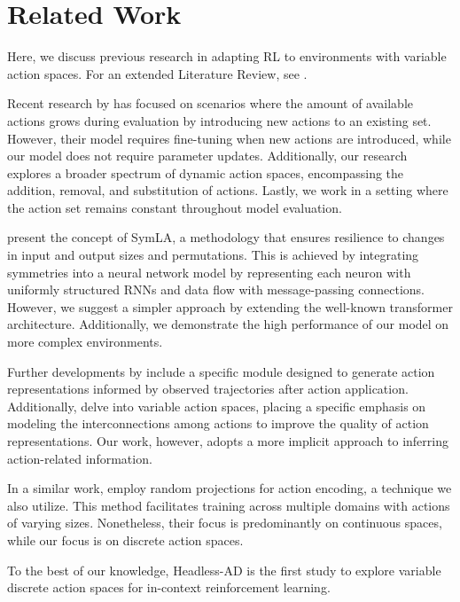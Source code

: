 \section{Related Work}

Here, we discuss previous research in adapting RL to environments with variable action spaces. For an extended Literature Review, see .

Recent research by \citet{chandak2020lifelong, ye2023action} has focused on scenarios where the amount of available actions grows during evaluation by introducing new actions to an existing set. However, their model requires fine-tuning when new actions are introduced, while our model does not require parameter updates. Additionally, our research explores a broader spectrum of dynamic action spaces, encompassing the addition, removal, and substitution of actions. Lastly, we work in a setting where the action set remains constant throughout model evaluation.

\citet{kirsch2022introducing} present the concept of SymLA, a methodology that ensures resilience to changes in input and output sizes and permutations. This is achieved by integrating symmetries into a neural network model by representing each neuron with uniformly structured RNNs and data flow with message-passing connections. However, we suggest a simpler approach by extending the well-known transformer architecture. Additionally, we demonstrate the high performance of our model on more complex environments.

Further developments by \citet{jain2020generalization} include a specific module designed to generate action representations informed by observed trajectories after action application. Additionally, \citet{jain2021know} delve into variable action spaces, placing a specific emphasis on modeling the interconnections among actions to improve the quality of action representations. Our work, however, adopts a more implicit approach to inferring action-related information.

In a similar work, \citet{lu2023structured, kirsch2023towards} employ random projections for action encoding, a technique we also utilize. This method facilitates training across multiple domains with actions of varying sizes. Nonetheless, their focus is predominantly on continuous spaces, while our focus is on discrete action spaces.


To the best of our knowledge, Headless-AD is the first study to explore variable discrete action spaces for in-context reinforcement learning.
